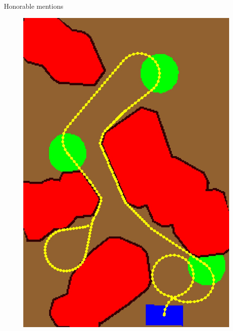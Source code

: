 \begin{frame}{Honorable mentions}
\begin{figure}[H]
	\begin{minipage}{0.45\linewidth}
		\includegraphics[scale=0.13]{Immagini/map6}
	\end{minipage}
	\vspace{0.10\linewidth}
	\begin{minipage}{0.45\linewidth}

\end{minipage}
\end{figure}
\end{frame}

